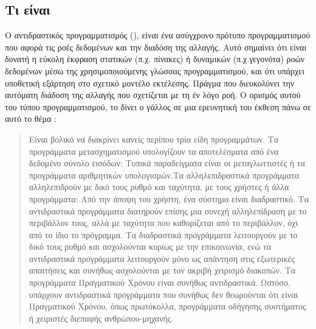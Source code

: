 \subsection*{Τι είναι}
\quad Ο αντιδραστικός προγραμματισμός (), είναι ένα ασύγχρονο πρότυπο προγραμματισμού που αφορά τις ροές δεδομένων και την διαδόση της αλλαγής. Αυτό σημαίνει ότι είναι δυνατή η εύκολη έκφραση στατικών (π.χ. πίνακες) ή δυναμικών (π.χ.γεγονότα) ροών δεδομένων μέσω της χρησιμοποιούμενης γλώσσας προγραμματισμού, και ότι υπάρχει υποθετική εξάρτηση στο σχετικό μοντέλο εκτέλεσης. Πράγμα που διευκολύνει την αυτόματη διάδοση της αλλαγής που σχετίζεται με τη έν λόγο ροή.
Ο ορισμός αυτού του τύπου προγραμματισμού, το δίνει ο γάλλος  σε μια ερευνητική του έκθεση πάνω σε αυτό το θέμα :
\blockquote{Είναι βολικό να διακρίνει κανείς περίπου τρία είδη προγραμμάτων. Τα προγράμματα μετασχηματισμού υπολογίζουν τα αποτελέσματα από ένα δεδομένο σύνολο εισόδων: Τυπικά παραδείγματα είναι οι μεταγλωττιστές ή τα προγράμματα αριθμητικών υπολογισμών.Τα αλληλεπιδραστικά προγράμματα αλληλεπιδρούν με δικό τους ρυθμό και ταχύτητα, με τους χρήστες ή άλλα προγράμματα: Από την άποψη του χρήστη, ένα σύστημα  είναι διαδραστικό. Τα αντιδραστικά προγράμματα διατηρούν επίσης μια συνεχή αλληλεπίδραση με το περιβάλλον τους, αλλά με ταχύτητα που καθορίζεται από το περιβάλλον, όχι από το ίδιο το πρόγραμμα. Τα διαδραστικά προγράμματα λειτουργούν με το δικό τους ρυθμό και ασχολούνται κυρίως με την επικοινωνία, ενώ τα αντιδραστικά προγράμματα λειτουργούν μόνο ως απάντηση στις εξωτερικές απαιτήσεις και συνήθως ασχολούνται με τον ακριβή χειρισμό διακοπών. Τα προγράμματα Πραγματικού Χρόνου είναι συνήθως αντιδραστικά. Ωστόσο, υπάρχουν αντιδραστικά προγράμματα που συνήθως δεν θεωρούνται ότι είναι Πραγματικού Χρόνου, όπως πρωτόκολλα, προγράμματα οδήγησης συστήματος ή χειριστές διεπαφής ανθρώπου-μηχανής.}

